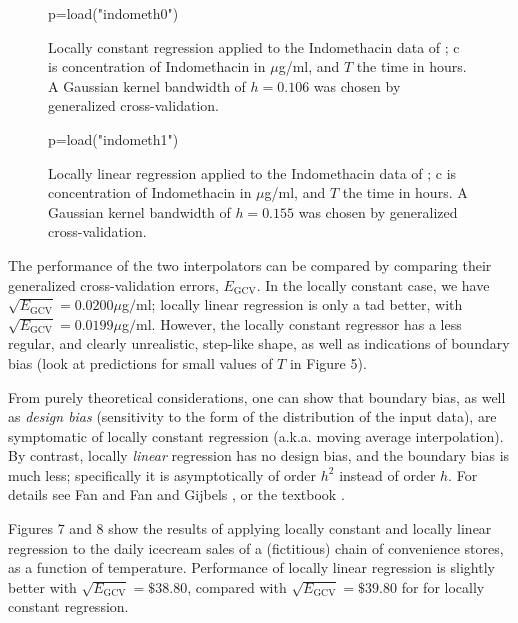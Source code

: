 \documentclass[11pt, reqno]{amsart}
\begin{document}
\begin{figure}
  \begin{sagesilent}
     p=load("indometh0")
  \end{sagesilent}
  \centering 
  \caption{{} Locally constant regression applied to the Indomethacin
    data of \cite{Kwan_etal_76}; c is concentration of Indomethacin in
    $\mu$g/ml, and $T$ the time in hours. A Gaussian kernel bandwidth
    of $h=0.106$ was chosen by generalized cross-validation.}
\end{figure}

\begin{figure}
  \begin{sagesilent}
     p=load("indometh1")
  \end{sagesilent}
  \centering 
  \caption{{} Locally linear regression applied to the Indomethacin
    data of \cite{Kwan_etal_76}; c is concentration of Indomethacin in
    $\mu$g/ml, and $T$ the time in hours. A Gaussian kernel bandwidth
    of $h=0.155$ was chosen by generalized cross-validation.}
\end{figure}

The performance of the two interpolators can be compared by comparing
their generalized cross-validation errors, $E_\text{GCV}$. In the
locally constant case, we have $\sqrt{E_\text{GCV}}=0.0200\mu$g$/$ml;
locally linear regression is only a tad better, with
$\sqrt{E_\text{GCV}}=0.0199\mu$g$/$ml. However, the locally constant
regressor has a less regular, and clearly unrealistic, step-like
shape, as well as indications of boundary bias (look at predictions
for small values of $T$ in Figure 5).

From purely theoretical considerations, one can show that boundary
bias, as well as {\em design bias} (sensitivity to the form of the
distribution of the input data), are symptomatic of locally constant
regression (a.k.a. moving average interpolation). By contrast, locally
{\em linear} regression has no design bias, and the boundary bias is
much less; specifically it is asymptotically of order $h^2$ instead of
order $h$. For details see Fan \cite{Fan_92}
and Fan and Gijbels \cite{Fan_Gijbels_96}, or the textbook
\cite{Wasserman_06}.

Figures 7 and 8 show the results of applying locally constant and
locally linear regression to the daily icecream sales of a (fictitious)
chain of convenience stores, as a function of temperature. Performance
of locally linear regression is slightly better with
$\sqrt{E_\text{GCV}}=\$38.80$, compared with
$\sqrt{E_\text{GCV}}=\$39.80$ for for locally constant regression.
\end{document}
